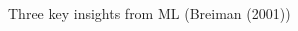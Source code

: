 \documentclass[notes,11pt, aspectratio=169]{beamer}
\begin{document}
\begin{frame}{Three key insights from ML (Breiman (2001))}
\begin{columns}[onlytextwidth, T]
\begin{column}{.4\textwidth}

\end{column}
\end{columns}
\end{frame}
\end{document}
